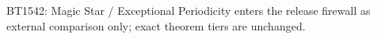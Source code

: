 \begin{center}\small
BT1542: Magic Star / Exceptional Periodicity enters the release firewall as external comparison only; exact theorem tiers are unchanged.
\end{center}
